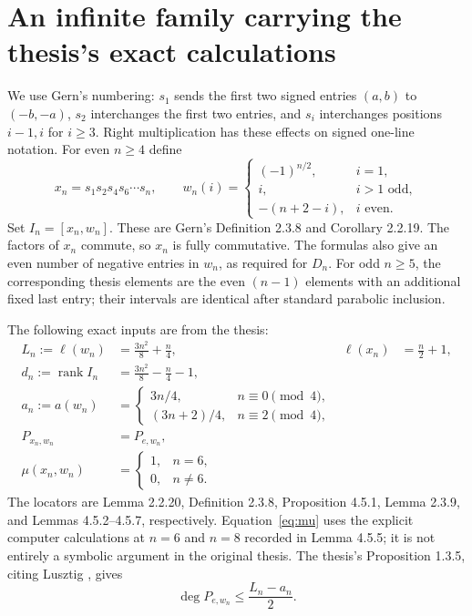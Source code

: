 \documentclass[11pt]{article}
\theoremstyle{definition}\newtheorem{definition}[theorem]{Definition}
\theoremstyle{remark}\newtheorem{remark}[theorem]{Remark}
\begin{document}
\section{An infinite family carrying the thesis's exact calculations}
We use Gern's numbering: $s_1$ sends the first two signed entries
$(a,b)$ to $(-b,-a)$, $s_2$ interchanges the first two entries, and
$s_i$ interchanges positions $i-1,i$ for $i\geq3$.
Right multiplication has these effects on signed one-line notation.
For even $n\geq4$ define
\[
 x_n=s_1s_2s_4s_6\cdots s_n,
 \qquad
 w_n(i)=\begin{cases}
 (-1)^{n/2},&i=1,\\
 i,&i>1\text{ odd},\\
 -(n+2-i),&i\text{ even}.
 \end{cases}
\]
Set $I_n=[x_n,w_n]$. These are Gern's Definition 2.3.8 and
Corollary 2.2.19. The factors of $x_n$ commute, so $x_n$ is fully
commutative. The formulas also give an even number of negative entries
in $w_n$, as required for $D_n$.
For odd $n\geq5$, the corresponding thesis elements are the even
$(n-1)$ elements with an additional fixed last entry; their intervals
are identical after standard parabolic inclusion.

The following exact inputs are from the thesis:
\begin{align}
 L_n:=\ell(w_n)&=\frac{3n^2}{8}+\frac n4,
 &\ell(x_n)&=\frac n2+1,\label{eq:lengths}\\
 d_n:=\operatorname{rank} I_n&=\frac{3n^2}{8}-\frac n4-1,\label{eq:rank}\\
 a_n:=a(w_n)&=\begin{cases}
 3n/4,&n\equiv0\pmod4,\\
 (3n+2)/4,&n\equiv2\pmod4,
 \end{cases}\label{eq:a}\\
 P_{x_n,w_n}&=P_{e,w_n},\label{eq:equality}\\
 \mu(x_n,w_n)&=\begin{cases}1,&n=6,\\0,&n\ne6.\end{cases}\label{eq:mu}
\end{align}
The locators are Lemma 2.2.20, Definition 2.3.8, Proposition 4.5.1,
Lemma 2.3.9, and Lemmas 4.5.2--4.5.7, respectively.
Equation~\eqref{eq:mu} uses the explicit computer calculations at
$n=6$ and $n=8$ recorded in Lemma 4.5.5; it is not entirely a symbolic
argument in the original thesis.
The thesis's Proposition 1.3.5, citing Lusztig \cite[1.3(a)]{lusztig}, gives
\[
 \deg P_{e,w_n}\leq \frac{L_n-a_n}{2}.
\]
\end{document}
